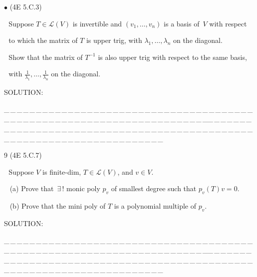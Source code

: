 \documentclass[a4paper, 11pt, UTF8]{article}
\def\Lm{\mathcal{L}}
\begin{document}
\begin{large}
{\small $\bullet$} (\normalsize{4E 5.C.3})\par\,\, {\timessl\Large 
Suppose $T\in \Lm(V)$ is invertible and $(v_1 , \dots , v_n)$ is a basis of \,$V$ with respect}\par\,\,
{\timessl\Large to which the matrix of $T$ is upper trig, with $\lambda_1 , \dots , \lambda_n$ on the diagonal.}\par\,\,
{\timessl\Large
Show that the matrix of $T^{-1}$ is also upper trig with respect to the same basis,}\par\,\,
{\timessl\Large with
{\normalsize$\displaystyle\frac{1}{\lambda_1},\dots,\frac{1}{\lambda_n}$} on the diagonal.
}\par
{\timesbf S\footnotesize{OLUTION:}}\par\quad

\par
{\tiny \_\,\_\,\_\,\_\,\_\,\_\,\_\,\_\,\_\,\_\,\_\,\_\,\_\,\_\,\_\,\_\,\_\,\_\,\_\,\_\,\_\,\_\,\_\,\_\,\_\,\_\,\_\,\_\,\_\,\_\,\_\,\_\,\_\,\_\,\_\,\_\,\_\,\_\,\_\,\_\,\_\,\_\,\_\,\_\,\_\,\_\,\_\,\_\,\_\,\_\,\_\,\_\,\_\,\_\,\_\,\_\,\_\,\_\,\_\,\_\,\_\,\_\,\_\,\_\,\_\,\_\,\_\,\_\,\_\,\_\,\_\_\,\_\,\_\,\_\,\_\,\_\,\_\,\_\,\_\,\_\,\_\,\_\,\_\,\_\,\_\,\_\,\_\,\_\,\_\,\_\,\_\,\_\,\_\,\_\,\_\,\_\,\_\,\_\,\_\,\_\,\_\,\_\,\_\,\_\,\_\,\_\,\_\,\_\,\_\,\_\,\_\,\_\,\_\,\_\,\_\,\_\,\_\,\_\,\_\,\_\,\_\,\_\,\_\,\_\,\_\,\_\,\_\,\_\,\_\,\_\,\_\,\_\,\_\,\_\,\_\,\_\,\_\,\_\,\_\,\_\,\_}\par

{\timesbf\Large 9} (\normalsize{4E 5.C.7})\par\,\, {\timessl\Large 
Suppose $V$ is finite-dim, $T\in \Lm(V)$, and $v \in V$.
}\par\,\,\,
(a) {\timessl\Large
Prove that $\,\exists\,!$ monic poly $p_v$ of smallest degree such that $p_v (T)v = 0$.
}\par\,\,\,
(b) {\timessl\Large
Prove that the mini poly of $T$ is a polynomial multiple of $p_v$.
}\par
{\timesbf S\footnotesize{OLUTION:}}\par\quad

\par
{\tiny \_\,\_\,\_\,\_\,\_\,\_\,\_\,\_\,\_\,\_\,\_\,\_\,\_\,\_\,\_\,\_\,\_\,\_\,\_\,\_\,\_\,\_\,\_\,\_\,\_\,\_\,\_\,\_\,\_\,\_\,\_\,\_\,\_\,\_\,\_\,\_\,\_\,\_\,\_\,\_\,\_\,\_\,\_\,\_\,\_\,\_\,\_\,\_\,\_\,\_\,\_\,\_\,\_\,\_\,\_\,\_\,\_\,\_\,\_\,\_\,\_\,\_\,\_\,\_\,\_\,\_\,\_\,\_\,\_\,\_\,\_\_\,\_\,\_\,\_\,\_\,\_\,\_\,\_\,\_\,\_\,\_\,\_\,\_\,\_\,\_\,\_\,\_\,\_\,\_\,\_\,\_\,\_\,\_\,\_\,\_\,\_\,\_\,\_\,\_\,\_\,\_\,\_\,\_\,\_\,\_\,\_\,\_\,\_\,\_\,\_\,\_\,\_\,\_\,\_\,\_\,\_\,\_\,\_\,\_\,\_\,\_\,\_\,\_\,\_\,\_\,\_\,\_\,\_\,\_\,\_\,\_\,\_\,\_\,\_\,\_\,\_\,\_\,\_\,\_\,\_\,\_}\par



\end{large}
\end{document}
